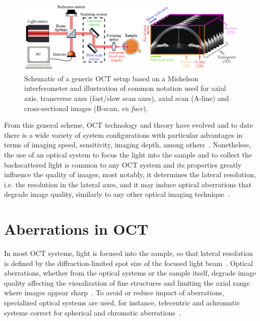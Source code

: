 \begin{figure}
    \centering
    \includegraphics[width=\textwidth]{Figures/Introduction/OCT_ScanningSchemes.pdf}
    \caption[Schematic of a generic OCT setup based on a Michelson interferometer and illustration of common notation.]{Schematic of a generic OCT setup based on a Michelson interferometer and illustration of common notation used for axial axis, transverse axes (fast/slow scan axes), axial scan (A-line) and cross-sectional images (B-scan, \textit{en face}).}
    \label{fig:OCT_ScanningScheme}
\end{figure}

From this general scheme, OCT technology and theory have evolved and to date there is a wide variety of system configurations with particular advantages in terms of imaging speed, sensitivity, imaging depth, among others~\cite{Fujimoto2015_Introduction}. Nonetheless, the use of an optical system to focus the light into the sample and to collect the backscattered light is common to any OCT system and its properties greatly influence the quality of images, most notably, it determines the lateral resolution, i.e. the resolution in the lateral axes, and it may induce optical aberrations that degrade image quality, similarly to any other optical imaging technique~\cite{Ralston2006_Interferometric, Yasuno2006_Noniterative, Adie2012_Computational}.

\section{Aberrations in OCT}

In most OCT systems, light is focused into the sample, so that lateral resolution is defined by the diffraction-limited spot size of the focused light beam~\cite{Fujimoto2015_Introduction}. Optical aberrations, whether from the optical systems or the sample itself, degrade image quality affecting the visualization of fine structures and limiting the axial range where images appear sharp~\cite{Ralston2006_Interferometric,Zawadzki2005_Adaptiveoptics}. To avoid or reduce impact of aberrations, specialized optical systems are used, for instance, telecentric and achromatic systems correct for spherical and chromatic aberrations~\cite{Hu2015_Optical}.

